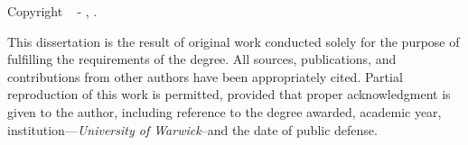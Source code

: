 
\vspace*{\fill}

{%
    \noindent \textbf{\GetTitle}
    
    \noindent Copyright \textcopyright~\the\year{} - \GetFirstAuthor, \GetSchool.
    
    \vspace{.575em}

    \noindent This dissertation is the result of original work conducted solely for the purpose of fulfilling the requirements of the degree. All sources, publications, and contributions from other authors have been appropriately cited. Partial reproduction of this work is permitted, provided that proper acknowledgment is given to the author, including reference to the degree awarded, academic year, institution---\textit{University of Warwick}--and the date of public defense.

    \vspace{2.4em}
    
    \noindent{}
    

}

\vspace*{\fill}
\MediaOptionLogic